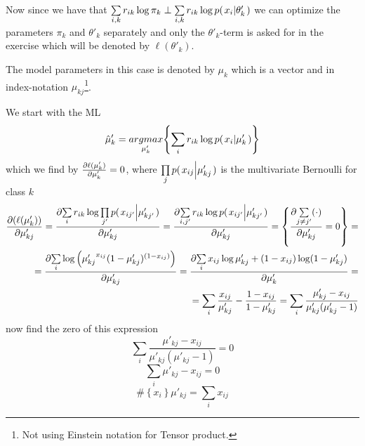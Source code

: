 \documentclass[a4paper,twoside=false,abstract=false,numbers=noenddot,
titlepage=false,headings=small,parskip=half,version=last]{scrartcl}
\begin{document}
\begin{solution}
    Now since we have that $\sum\limits_{i,k}r_{ik}\log\pi_k \perp
    \sum\limits_{i,k}r_{ik}\log p{(\left. x_i \middle\vert \theta'_k \right.)}$ we can optimize the parameters
    $\pi_k$ and $\theta'_k$ separately and only the $\theta'_k$-term is asked for in the
    exercise which will be denoted by $\ell(\theta'_k)$.

    The model parameters in this case is denoted by $\mu_k$ which is a vector
    and in index-notation $\mu_{kj}$\footnote{Not using Einstein notation for
    Tensor product.}.

    We start with the ML
    \begin{equation}
        \hat{\mu}'_k = \underset{\mu'_k}{argmax}{\left\{\sum\limits_i
        r_{ik}\log p{(\left. x_i \middle\vert \mu'_k \right.)}\right\}}
    \end{equation}
    which we find by $\frac{\partial{\ell(\mu'_k)}}{\partial{\mu'_k}}=0$, where 
    $\prod\limits_j p{(\left. x_{ij} \middle\vert \mu'_{kj} \right.)}$ 
    is the multivariate Bernoulli for class $k$
    \begin{eqnarray}
        \frac{\partial{
            \left(
            \ell(\mu'_k)
            \right)
        }}{\partial{
            \mu'_{kj}
        }} = 
        \frac{\partial{
            \sum\limits_i r_{ik}\log \prod\limits_{j'} p{(\left. x_{ij'} \middle\vert \mu'_{kj'} \right.)}
        }}{\partial{
            \mu'_{kj} 
        }}=
        \frac{\partial{
        \sum\limits_{i,j'} r_{ik}\log p{(\left. x_{ij'} \middle\vert \mu'_{kj'} \right.)} 
        }}{\partial{
            \mu'_{kj}
        }}= \left\{
            \frac{\partial{
                \sum\limits_{j\neq j'} (\cdot)
            }}{\partial{
                \mu'_{kj}
            }} = 0
            \right\}  = \\
        =
        \frac{\partial{
            \sum\limits_{i}\log \left(
                {\mu'_{kj}}^{x_{ij}}
                (1-{\mu'_{kj}})^{(1-x_{ij})}
            \right)
        }}{\partial{
            \mu'_{kj}
        }}
        =
        \frac{\partial{
            \sum\limits_{i} x_{ij}\log{\mu'_{kj}} + (1-x_{ij})\log({1-\mu'_{kj}})
        }}{\partial{
            \mu'_k  
        }} = \\
        = \sum\limits_{i} \frac{x_{ij}}{\mu'_{kj}} -
        \frac{1-x_{ij}}{1-\mu'_{kj}} =
        \sum\limits_i \frac{
            \mu'_{kj} - x_{ij}
        }
        {
            \mu'_{kj}(\mu'_{kj}-1)    
        }
    \end{eqnarray}
    now find the zero of this expression
    \begin{equation}
         \sum\limits_i \frac{
            \mu'_{kj} - x_{ij}
        }
        {
            \mu'_{kj}(\mu'_{kj}-1)    
        } = 0
    \end{equation}
    \begin{equation}
         \sum\limits_i
            \mu'_{kj} - x_{ij}
         = 0
    \end{equation}
    \begin{equation}
       \#\left\{x_i\right\}\mu'_{kj} = \sum\limits_i x_{ij} 
    \end{equation}

\end{solution}

\end{document}
